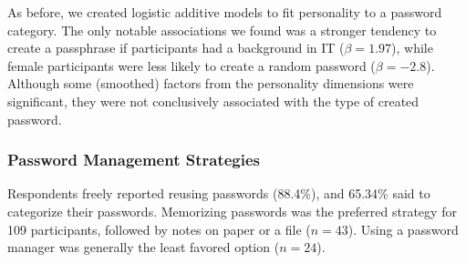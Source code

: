 As before, we created logistic additive models to fit personality to a password category. The only notable associations we found was a stronger tendency to create a passphrase if participants had a background in IT ($\beta=1.97$), while female participants were less likely to create a random password ($\beta =-2.8$). Although some (smoothed) factors from the personality dimensions were significant, they were not conclusively associated with the type of created password.

\subsubsection{Password Management Strategies}
Respondents freely reported reusing passwords (88.4\%), and 65.34\% said to categorize their passwords. Memorizing passwords was the preferred strategy for 109 participants, followed by notes on paper or a file ($n=43$). Using a password manager was generally the least favored option ($n=24$).

